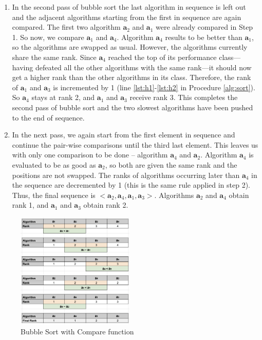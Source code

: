 \documentclass[conference]{IEEEtran}
\begin{document}
\begin{enumerate}
	\item
		   In the second pass of bubble sort the last algorithm in sequence is left out and the adjacent algorithms starting from the first in sequence are again compared. The first two algorithm $\mathbf{a}_2$ and $\mathbf{a}_1$ were already compared in Step 1. So now, we compare  $\mathbf{a}_1$ and $\mathbf{a}_4$.
          Algorithm $\mathbf{a}_4$ results to be better than $\mathbf{a}_1$, so the algorithms are swapped as usual. However, the
          algorithms currently share the same rank. Since $\mathbf{a}_4$ reached the top of its performance
          class---having defeated all the other algorithms with the same rank---it should now get a higher rank than the
          other algorithms in its class. Therefore, the rank of $\mathbf{a}_1$ and $\mathbf{a}_3$ is incremented by 1
          (line \ref{lst:h1}-\ref{lst:h2} in Procedure \ref{alg:sort}). So $\mathbf{a}_4$ stays at rank 2, and $\mathbf{a}_1$ and $\mathbf{a}_3$ receive rank 3. This completes the second pass of bubble sort and the two slowest algorithms have been pushed to the end of sequence.
	
	\item
          In the next pass, we again start from the first element in sequence and continue the pair-wise comparisons until the third last element. This leaves us with only one comparison to be done -- algorithm  $\mathbf{a}_4$ and $\mathbf{a}_2$.
          Algorithm $\mathbf{a}_4$ is evaluated to be as good as $\mathbf{a}_2$, so both are given the same rank and the positions are not swapped. The ranks of algorithms occurring later than $\mathbf{a}_4$ in the sequence are decremented by 1 (this is the same rule applied in step 2). Thus,
          the final sequence is $<\mathbf{a}_2, \mathbf{a}_4, \mathbf{a}_1, \mathbf{a}_3>$. Algorithms $\mathbf{a}_2$ and $\mathbf{a}_4$ obtain rank 1, and $\mathbf{a}_1$ and $\mathbf{a}_3$ obtain rank 2.
\end{enumerate}

\begin{figure}
	\includegraphics[width=0.5\textwidth]{fig/ranking}
	\caption{Bubble Sort with Compare function}
	\label{fig:sort}
\end{figure}
\end{document}
